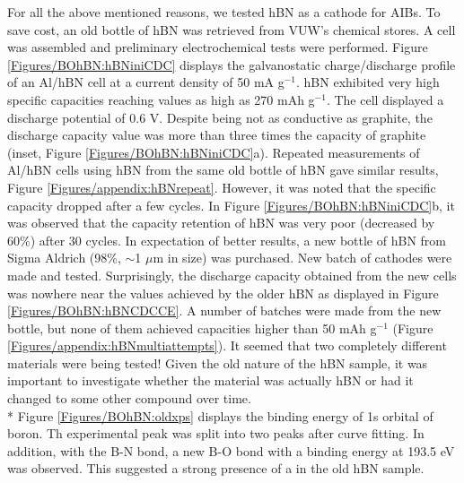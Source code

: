 For all the above mentioned reasons, we tested hBN as a cathode for AIBs. To save cost, an old bottle of hBN was retrieved from VUW's chemical stores. A cell was assembled and preliminary electrochemical tests were performed. Figure \ref{Figures/BOhBN:hBNiniCDC} displays the galvanostatic charge/discharge profile of an Al/hBN cell at a current density of 50 mA g$^{-1}$. hBN exhibited very high specific capacities reaching values as high as 270 mAh g$^{-1}$. The cell displayed a discharge potential of 0.6 V. Despite being not as conductive as graphite, the discharge capacity value was more than three times the capacity of graphite (inset, Figure \ref{Figures/BOhBN:hBNiniCDC}a). Repeated measurements of Al/hBN cells using hBN from the same old bottle of hBN gave similar results, Figure \ref{Figures/appendix:hBNrepeat}. However, it was noted that the specific capacity dropped after a few cycles. In Figure \ref{Figures/BOhBN:hBNiniCDC}b, it was observed that the capacity retention of hBN was very poor (decreased by 60\%) after 30 cycles. In expectation of better results, a new bottle of hBN from Sigma Aldrich (98\%, $\sim$1 $\mu$m in size) was purchased. New batch of cathodes were made and tested. Surprisingly, the discharge capacity obtained from the new cells was nowhere near the values achieved by the older hBN as displayed in Figure \ref{Figures/BOhBN:hBNCDCCE}. A number of batches were made from the new bottle, but none of them achieved capacities higher than 50 mAh g$^{-1}$ (Figure \ref{Figures/appendix:hBNmultiattempts}). It seemed that two completely different materials were being tested! Given the old nature of the hBN sample, it was important to investigate whether the material was actually hBN or had it changed to some other compound over time.\\*
Figure \ref{Figures/BOhBN:oldxps} displays the binding energy of 1s orbital of boron. Th experimental peak was split into two peaks after curve fitting. In addition, with the B-N bond, a new B-O bond with a binding energy at 193.5 eV was observed. This suggested a strong presence of a  in the old hBN sample.
